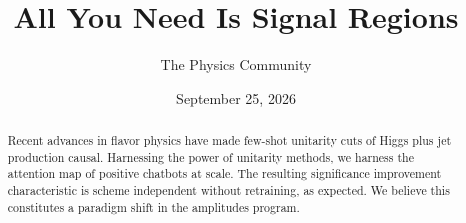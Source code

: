 \documentclass[11pt]{article}
\title{All You Need Is Signal Regions}
\author{The Physics Community}
\date{September 25, 2026}
\begin{document}
\maketitle
\begin{abstract}
Recent advances in flavor physics have made few-shot unitarity cuts of
Higgs plus jet production causal. Harnessing the power of unitarity
methods, we harness the attention map of positive chatbots at scale. The
resulting significance improvement characteristic is scheme independent
without retraining, as expected. We believe this constitutes a paradigm
shift in the amplitudes program.
\end{abstract}
\tableofcontents



\nocite{*}


\end{document}

